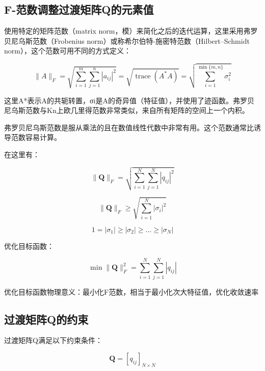 \subsection{F-范数调整过渡矩阵Q的元素值}

使用特定的矩阵范数（matrix norm，模）来简化之后的迭代运算，这里采用弗罗贝尼乌斯范数（Frobenius norm）或称希尔伯特-施密特范数（Hilbert–Schmidt norm），这个范数可用不同的方式定义：

\begin{equation}
    \|A\|_{F}=\sqrt{\sum_{i=1}^{m} \sum_{j=1}^{n}\left|a_{i j}\right|^{2}}=\sqrt{\operatorname{trace}\left(A^{*} A\right)}=\sqrt{\sum_{i=1}^{\min \{m, n\}} \sigma_{i}^{2}}
\end{equation}

这里A*表示A的共轭转置，σi是A的奇异值（特征值），并使用了迹函数。弗罗贝尼乌斯范数与Kn上欧几里得范数非常类似，来自所有矩阵的空间上一个内积。

弗罗贝尼乌斯范数是服从乘法的且在数值线性代数中非常有用。这个范数通常比诱导范数容易计算。

在这里有：

\begin{equation}
    \|\mathbf{Q}\|_{F}=\sqrt{\sum_{i=1}^{N} \sum_{j=1}^{N}\left|q_{i j}\right|^{2}}
\end{equation}

\begin{equation}
    \|\mathbf{Q}\|_{F} \geq \sqrt{\sum_{i=1}^{N}\left|\sigma_{i}\right|^{2}}
\end{equation}

\begin{equation}
    1=\left|\sigma_{1}\right| \geq\left|\sigma_{2}\right| \geq \ldots \geq\left|\sigma_{N}\right|
\end{equation}

优化目标函数：

\begin{equation}
    \min \|\mathbf{Q}\|_{F}^{2}=\sum_{i=1}^{N} \sum_{j=1}^{N}\left|q_{i j}\right|
\end{equation}

优化目标函数物理意义：最小化F范数，相当于最小化次大特征值，优化收敛速率

\subsection{过渡矩阵Q的约束}

过渡矩阵Q满足以下约束条件：

\begin{equation}
    \mathbf{Q}=\left[q_{i j}\right]_{N \times N}
\end{equation}

